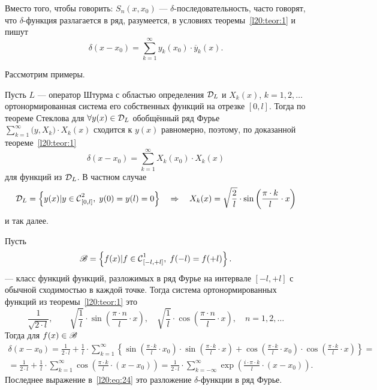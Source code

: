 Вместо того, чтобы говорить: $S_n(x,x_0)$ --- $\delta$-последовательность, часто говорят, что $\delta$-функция разлагается в ряд, разумеется, в условиях теоремы~\ref{l20:teor:1} и пишут 
\begin{equation}\label{l20:eq:22}
	\delta(x-x_0)=\sum\limits_{k=1}^{\infty}y_k(x_0)\cdot\overline{y}_k(x).
\end{equation}

\noindent Рассмотрим примеры.
\begin{enumerateD}
	\item Пусть $L$ --- оператор Штурма с областью определения $\mc{D}_L$ и $X_k(x)$, $k=1,2,\ldots$ ортонормированная система его собственных функций на отрезке $[0,l]$. Тогда по теореме Стеклова для $\forall y(x)\in\mc{D}_L$ обобщённый ряд Фурье $\displaystyle\sum\limits_{k=1}^{\infty}\big(y,X_k\big)\cdot X_k(x)$ сходится к $y(x)$ равномерно, поэтому, по доказанной теореме~\ref{l20:teor:1}
	\begin{equation}\label{l20:eq:23}
		\delta(x-x_0)=\sum\limits_{k=1}^{\infty}X_k(x_0)\cdot X_k(x)
	\end{equation}
	для функций из $\mc{D}_L$. В частном случае
	\begin{equation*}
		\mc{D}_L=\left\{y(x)|y\in\Cfn[{[0,l]}]{2},\;y(0)=y(l)=0\right\}\quad\Rightarrow\quad X_k(x)=\sqrt{\frac{2}{l}}\cdot\sin\left(\frac{\pi\cdot k}{
			l}\cdot x\right)
	\end{equation*}
	и так далее.
	\item Пусть
	\begin{equation*}
		\ms{B}=\left\{f(x)|f\in\Cfn[{[-l,+l]}]{1},\;f(-l)=f(+l)\right\}.
	\end{equation*}
	 --- класс функций функций, разложимых в ряд Фурье на интервале $[-l,+l]$ с обычной сходимостью в каждой точке. Тогда система ортонормированных функций из теоремы~\ref{l20:teor:1} это 
	\begin{equation*}
		\frac{1}{\sqrt{2\cdot l}},\qquad\sqrt{\frac{1}{l}}\cdot\sin\left(\frac{\pi\cdot n}{l}\cdot x\right),\quad\sqrt{\frac{1}{l}}\cdot\cos\left(\frac{\pi\cdot n}{l}\cdot x\right),\quad n=1,2,\ldots
	\end{equation*}
	Тогда для $f(x)\in\ms{B}$
	\begin{multline}\label{l20:eq:24}
		\delta(x-x_0)=\frac{1}{2\cdot l}+\frac{1}{l}\cdot\sum\limits_{k=1}^{\infty}\left\{\sin\left(\frac{\pi\cdot k}{l}\cdot x_0\right)\cdot\sin\left(\frac{\pi\cdot k}{l}\cdot x\right)+\cos\left(\frac{\pi\cdot k}{l}\cdot x_0\right)\cdot\cos\left(\frac{\pi\cdot k}{l}\cdot x\right)\right\}=\\
		=\frac{1}{2\cdot l}+\frac{1}{l}\cdot\sum\limits_{k=1}^{\infty}\cos\left(\frac{\pi\cdot k}{l}\cdot (x-x_0)\right)=\frac{1}{2\cdot l}\cdot\sum\limits_{k=-\infty}^{\infty}\exp\left(\frac{i\cdot\pi\cdot k}{l}\cdot (x-x_0)\right).
	\end{multline}
	Последнее выражение в~\eqref{l20:eq:24} это разложение $\delta$-функции в ряд Фурье.
\end{enumerateD}

